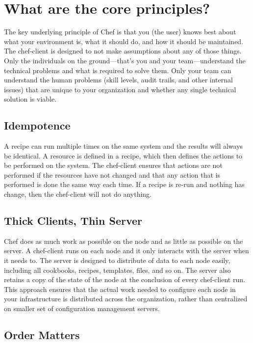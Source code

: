 \section{What are the core principles?}

The key underlying principle of Chef is that you (the user) knows best about what your environment is, what it should do, and how it should be maintained. The chef-client is designed to not make assumptions about any of those things. Only the individuals on the ground—that's you and your team—understand the technical problems and what is required to solve them. Only your team can understand the human problems (skill levels, audit trails, and other internal issues) that are unique to your organization and whether any single technical solution is viable.

\subsection{Idempotence}

A recipe can run multiple times on the same system and the results will always be identical. A resource is defined in a recipe, which then defines the actions to be performed on the system. The chef-client ensures that actions are not performed if the resources have not changed and that any action that is performed is done the same way each time. If a recipe is re-run and nothing has change, then the chef-client will not do anything.

\subsection{Thick Clients, Thin Server}

Chef does as much work as possible on the node and as little as possible on the server. A chef-client runs on each node and it only interacts with the server when it needs to. The server is designed to distribute of data to each node easily, including all cookbooks, recipes, templates, files, and so on. The server also retains a copy of the state of the node at the conclusion of every chef-client run. This approach ensures that the actual work needed to configure each node in your infrastructure is distributed across the organization, rather than centralized on smaller set of configuration management servers.

\subsection{Order Matters}

